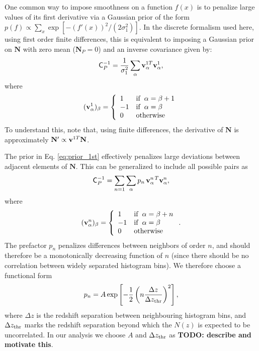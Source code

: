 \documentclass[a4paper,11pt]{article}
\newcommand{\todo}[1]{{\bf TODO: #1}}
\newcommand{\vN}{\mathbf{N}}
\begin{document}
      One common way to impose smoothness on a function $f(x)$ is to penalize large values of its first derivative via a Gaussian prior of the form $p(f)\propto\sum_x\exp\left[-(f'(x))^2/(2\sigma_1^2)\right]$. In the discrete formalism used here, using first order finite differences, this is equivalent to imposing a Gaussian prior on $\vN$ with zero mean ($\vN_P=0$) and an inverse covariance given by:
      \begin{equation}\label{eq:prior_1st}
        {\sf C}^{-1}_P=\frac{1}{\sigma_1^2}\sum_\alpha {\bf v}^{1T}_\alpha{\bf v}^1_\alpha,
      \end{equation}
      where
      \begin{equation}
        ({\bf v}^1_\alpha)_\beta=\left\{
        \begin{array}{ll}
          1  & {\rm if}\,\,\, \alpha=\beta+1\\
          -1  &  {\rm if}\,\,\, \alpha=\beta\\
          0 & {\rm otherwise}
        \end{array}\right.
      \end{equation}
      To understand this, note that, using finite differences, the derivative of $\vN$ is approximately $\vN'\propto {\bf v}^{1T}\vN$.

      The prior in Eq. \ref{eq:prior_1st} effectively penalizes large deviations between adjacent elements of $\vN$. This can be generalized to include all possible pairs as
      \begin{equation}\label{eq:smooth1}
        {\sf C}^{-1}_P=\sum_{n=1}\sum_{\alpha}p_n\,{\bf v}^{n\,T}_\alpha{\bf v}^n_\alpha,
      \end{equation}
      where
      \begin{equation}
        ({\bf v}^n_\alpha)_\beta=\left\{
        \begin{array}{ll}
          1  & {\rm if}\,\,\, \alpha=\beta+n\\
          -1  &  {\rm if}\,\,\, \alpha=\beta\\
          0 & {\rm otherwise}
        \end{array} \right..
      \end{equation}
      The prefactor $p_n$ penalizes differences between neighbors of order $n$, and should therefore be a monotonically decreasing function of $n$ (since there should be no correlation between widely separated histogram bins). We therefore choose a functional form
      \begin{equation}
        p_n=A\,{\rm exp}\left[-\frac{1}{2}\left(n\frac{\Delta z}{\Delta z_{\rm thr}}\right)^2\right],
      \end{equation}
      where $\Delta z$ is the redshift separation between neighbouring histogram bins, and $\Delta z_{\rm thr}$ marks the redshift separation beyond which the $N(z)$ is expected to be uncorrelated. In our analysis we choose $A$ and $\Delta z_{\rm thr}$ as \todo{describe and motivate this}.
\end{document}
